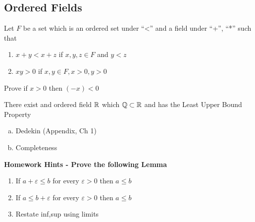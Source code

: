 \subsection{Ordered Fields}
\begin{definition}
	Let \( F \) be a set which is an ordered set under ``<'' and a field under ``+'', ``*'' such
	that 
	\begin{enumerate}
		\item \( x + y < x + z \) if \( x,y,z \in F \) and \( y < z \)
		\item \( xy > 0 \) if \( x,y \in F, x > 0, y > 0 \)
	\end{enumerate}
	\label{def:OrderedFields}
\end{definition}
\begin{exercise}
	Prove if \( x>0 \) then \( (-x) < 0 \)
\end{exercise}
\begin{theorem}
	There exist and ordered field \( \mathbb{R} \) which \( \mathbb{Q} \subset \mathbb{R} \) and has the Least Upper
	Bound Property
	\begin{enumerate}[a)]
		\item Dedekin (Appendix, Ch 1)
		\item Completeness
	\end{enumerate}
	\label{def:R}
\end{theorem}

\textbf{Homework Hints - Prove the following Lemma} 
\begin{enumerate}
	\item If \( a + \varepsilon \le b \) for every \( \varepsilon > 0 \) then \( a \le b \)
	\item If \( a \le b + \varepsilon \) for every \( \varepsilon > 0 \) then \( a \le b \)
	\item Restate inf,sup using limits
\end{enumerate}
